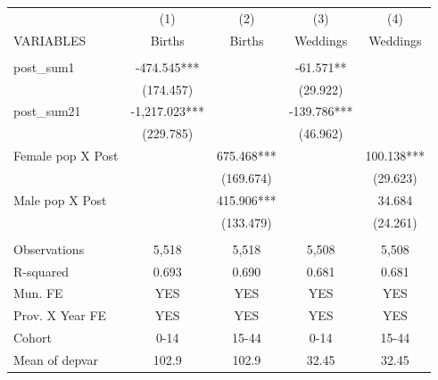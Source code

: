 \begin{tabular}{lcccc} \hline
 & (1) & (2) & (3) & (4) \\
VARIABLES & Births & Births & Weddings & Weddings \\ \hline
 &  &  &  &  \\
post\_sum1 & -474.545*** &  & -61.571** &  \\
 & (174.457) &  & (29.922) &  \\
post\_sum21 & -1,217.023*** &  & -139.786*** &  \\
 & (229.785) &  & (46.962) &  \\
Female pop X Post &  & 675.468*** &  & 100.138*** \\
 &  & (169.674) &  & (29.623) \\
Male pop X Post &  & 415.906*** &  & 34.684 \\
 &  & (133.479) &  & (24.261) \\
 &  &  &  &  \\
Observations & 5,518 & 5,518 & 5,508 & 5,508 \\
R-squared & 0.693 & 0.690 & 0.681 & 0.681 \\
Mun. FE & YES & YES & YES & YES \\
Prov. X Year FE & YES & YES & YES & YES \\
Cohort & 0-14 & 15-44 & 0-14 & 15-44 \\
 Mean of depvar & 102.9 & 102.9 & 32.45 & 32.45 \\ \hline
\end{tabular}
